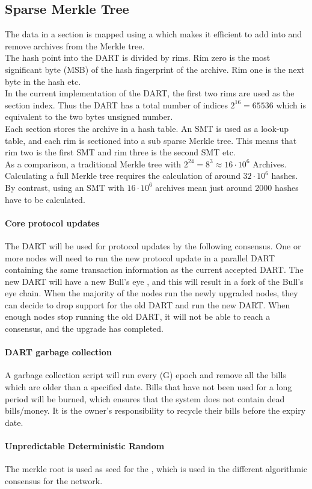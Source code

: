 \subsection{Sparse Merkle Tree}\label{sec:SMT}
The data in a section is mapped using a  which makes it efficient to add into and remove archives from the Merkle tree. \\
The hash point into the DART is divided by rims. Rim zero is the most significant byte (MSB) of the hash fingerprint of the archive. Rim one is the next byte in the hash etc. \\
In the current implementation of the DART, the first two rims are used as the section index. Thus the DART has a total number of indices $2^{16} = 65536$ which is equivalent to the two bytes unsigned number. \\
Each section stores the archive in a hash table. An SMT is used as a look-up table, and each rim is sectioned into a sub sparse Merkle tree. This means that rim two is the first SMT and rim three is the second SMT etc. \\ 
As a comparison, a traditional Merkle tree with $2^{24} = 8^3 \approx 16 \cdot 10^{6}$ Archives. Calculating a full Merkle tree requires the calculation of around $32 \cdot 10^6$ hashes. By contrast, using an SMT with $16 \cdot 10^{6}$  archives mean just around 2000 hashes have to be calculated.

\paragraph{Core protocol updates\\} 
The DART will be used for protocol updates by the following consensus. One or more nodes will need to run the new protocol update in a parallel DART containing the same transaction information as the current accepted DART. The new DART will have a new Bull's eye , and this will result in a fork of the Bull's eye chain. When the majority of the nodes run the newly upgraded nodes, they can decide to drop support for the old DART and run the new DART. When enough nodes stop running the old DART, it will not be able to reach a consensus, and the upgrade has completed.

\paragraph{DART garbage collection\\} 
A garbage collection script will run every (G) epoch and remove all the bills which are older than a specified date. Bills that have not been used for a long period will be burned, which ensures that the system does not contain dead bills/money.
It is the owner's responsibility to recycle their bills before the expiry date.


\paragraph{Unpredictable Deterministic Random\\}
The merkle root  is used as seed for the , which is used in the different algorithmic consensus for the network.
 